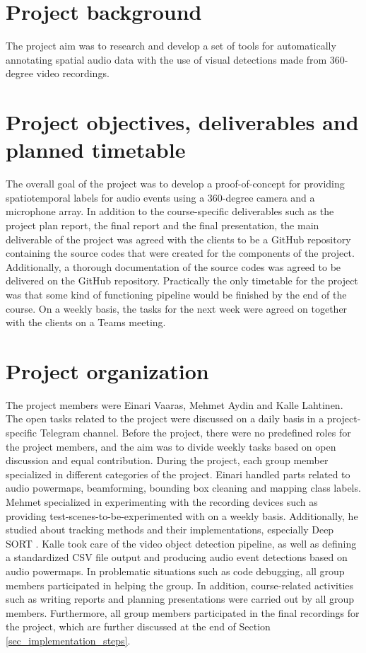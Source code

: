 \section{Project background}

The project aim was to research and develop a set of tools for automatically annotating spatial audio data with the use of visual detections made from 360-degree video recordings. 

\section{Project objectives, deliverables and planned timetable}

The overall goal of the project was to develop a proof-of-concept for providing spatiotemporal labels for audio events using a 360-degree camera and a microphone array. In addition to the course-specific deliverables such as the project plan report, the final report and the final presentation, the main deliverable of the project was agreed with the clients to be a GitHub repository containing the source codes that were created for the components of the project. Additionally, a thorough documentation of the source codes was agreed to be delivered on the GitHub repository. Practically the only timetable for the project was that some kind of functioning pipeline would be finished by the end of the course. On a weekly basis, the tasks for the next week were agreed on together with the clients on a Teams meeting.

\section{Project organization}

The project members were Einari Vaaras, Mehmet Aydin and Kalle Lahtinen. The open tasks related to the project were discussed on a daily basis in a project-specific Telegram channel. Before the project, there were no predefined roles for the project members, and the aim was to divide weekly tasks based on open discussion and equal contribution. During the project, each group member specialized in different categories of the project. Einari handled parts related to audio powermaps, beamforming, bounding box cleaning and mapping class labels. Mehmet specialized in experimenting with the recording devices such as providing test-scenes-to-be-experimented with on a weekly basis. Additionally, he studied about tracking methods and their implementations, especially Deep SORT \cite{deepsort}. Kalle took care of the video object detection pipeline, as well as defining a standardized CSV file output and producing audio event detections based on audio powermaps. In problematic situations such as code debugging, all group members participated in helping the group. In addition, course-related activities such as writing reports and planning presentations were carried out by all group members. Furthermore, all group members participated in the final recordings for the project, which are further discussed at the end of Section \ref{sec_implementation_steps}.


